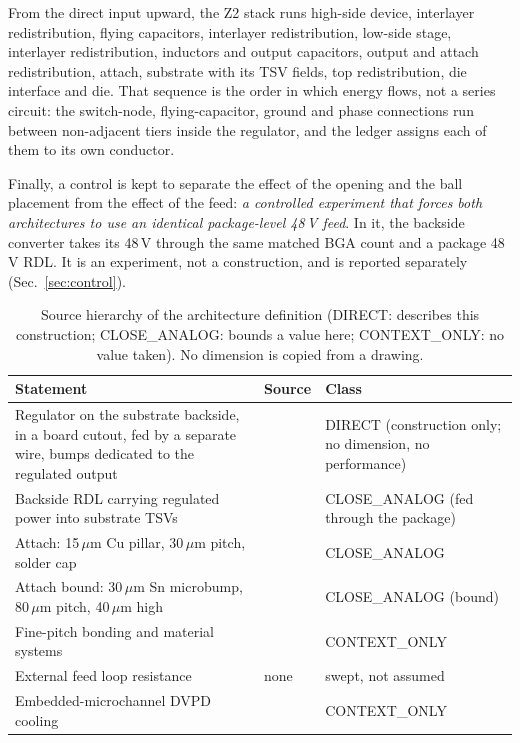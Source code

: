 \documentclass[journal]{IEEEtran}
\begin{document}
From the direct input upward, the Z2 stack runs high-side device, interlayer redistribution,
flying capacitors, interlayer redistribution, low-side stage, interlayer redistribution,
inductors and output capacitors, output and attach redistribution, attach, substrate with its
TSV fields, top redistribution, die interface and die. That sequence is the order in which
energy flows, not a series circuit: the switch-node, flying-capacitor, ground and phase
connections run between non-adjacent tiers inside the regulator, and the ledger assigns each
of them to its own conductor.

Finally, a control is kept to separate the effect of the opening and the ball placement from the
effect of the feed: \emph{a controlled experiment that forces both architectures to use an
identical package-level 48\,V feed}. In it, the backside converter takes its 48\,V through the
same matched BGA count and a package 48\,V RDL. It is an experiment, not a construction, and is
reported separately (Sec.~\ref{sec:control}).

\begin{table}[!t]
\caption{Source hierarchy of the architecture definition (DIRECT: describes this
construction; CLOSE\_ANALOG: bounds a value here; CONTEXT\_ONLY: no value taken). No
dimension is copied from a drawing.}
\label{tab:sources}
\centering
\footnotesize
\setlength{\tabcolsep}{2.5pt}
\begin{tabular}{@{}L{3.0cm}L{2.2cm}L{2.6cm}@{}}
\toprule
Statement & Source & Class \\
\midrule
Regulator on the substrate backside, in a board cutout, fed by a separate wire, bumps dedicated to the regulated output & \cite{ArmCutoutVR2026} & DIRECT (construction only; no dimension, no performance) \\
Backside RDL carrying regulated power into substrate TSVs & \cite{GoogleBacksideIVR2021} & CLOSE\_ANALOG (fed through the package) \\
Attach: 15\,$\mu$m Cu pillar, 30\,$\mu$m pitch, solder cap & \cite{Au2016CuPillar30um} & CLOSE\_ANALOG \\
Attach bound: 30\,$\mu$m Sn microbump, 80\,$\mu$m pitch, 40\,$\mu$m high & \cite{Na2022SnMicrobump} & CLOSE\_ANALOG (bound) \\
Fine-pitch bonding and material systems & \cite{Lee2017CuPillarNCF,Dai2018MicroBump30um,Xu2026CuPillarReview} & CONTEXT\_ONLY \\
External feed loop resistance & none & swept, not assumed \\
Embedded-microchannel DVPD cooling & \cite{Choi2024ITherm,Choi2025SelfConsistent} & CONTEXT\_ONLY \\
\bottomrule
\end{tabular}
\end{table}
\end{document}

